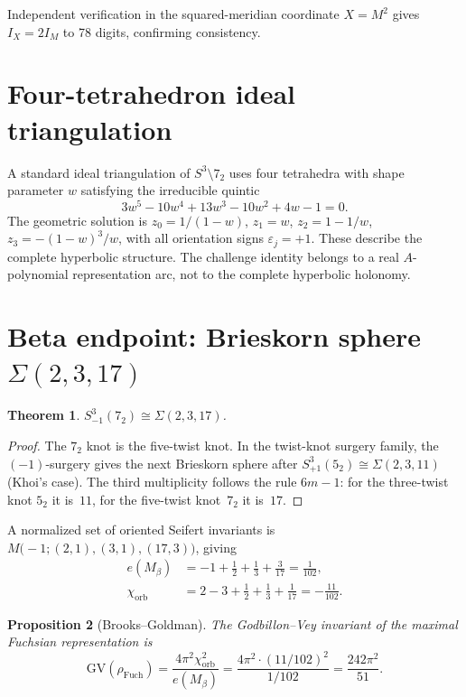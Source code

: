 \documentclass[11pt]{article}
\newtheorem{theorem}{Theorem}
\newtheorem{proposition}[theorem]{Proposition}
\theoremstyle{remark}
\begin{document}
Independent verification in the squared-meridian
coordinate $X = M^2$ gives
$I_X = 2I_M$ to 78 digits, confirming consistency.

\section{Four-tetrahedron ideal triangulation}

A standard ideal triangulation of $S^3 \setminus 7_2$ uses
four tetrahedra with shape parameter $w$ satisfying the
irreducible quintic
\begin{equation}\label{eq:shape}
3w^5 - 10w^4 + 13w^3 - 10w^2 + 4w - 1 = 0.
\end{equation}
The geometric solution is
$z_0 = 1/(1{-}w)$, $z_1 = w$,
$z_2 = 1 - 1/w$, $z_3 = -(1{-}w)^3/w$,
with all orientation signs $\varepsilon_j = +1$.
These describe the complete hyperbolic structure.
The challenge identity belongs to a real $A$-polynomial
representation arc, not to the complete hyperbolic holonomy.

\section{Beta endpoint: Brieskorn sphere $\Sigma(2,3,17)$}

\begin{theorem}\label{thm:brieskorn}
$S^3_{-1}(7_2) \cong \Sigma(2,3,17)$.
\end{theorem}

\begin{proof}
The $7_2$ knot is the five-twist knot. In the twist-knot
surgery family, the $(-1)$-surgery gives the next Brieskorn
sphere after $S^3_{+1}(5_2) \cong \Sigma(2,3,11)$ (Khoi's
case). The third multiplicity follows the rule $6m-1$: for the
three-twist knot $5_2$ it is~$11$, for the five-twist
knot~$7_2$ it is~$17$.
\end{proof}

A normalized set of oriented Seifert invariants is
$M\bigl(-1; (2,1), (3,1), (17,3)\bigr)$, giving
\begin{align}
e(M_\beta) &= -1 + \tfrac{1}{2} + \tfrac{1}{3}
+ \tfrac{3}{17} = \tfrac{1}{102}, \label{eq:euler}\\
\chi_{\mathrm{orb}} &= 2 - 3 + \tfrac{1}{2} + \tfrac{1}{3}
+ \tfrac{1}{17} = -\tfrac{11}{102}. \label{eq:chi}
\end{align}

\begin{proposition}[Brooks--Goldman]\label{prop:bg}
The Godbillon--Vey invariant of the maximal Fuchsian
representation is
\begin{equation}\label{eq:gv-beta}
\mathrm{GV}(\rho_{\mathrm{Fuch}})
= \frac{4\pi^2 \chi_{\mathrm{orb}}^2}{e(M_\beta)}
= \frac{4\pi^2 \cdot (11/102)^2}{1/102}
= \frac{242\pi^2}{51}.
\end{equation}
\end{proposition}
\end{document}
